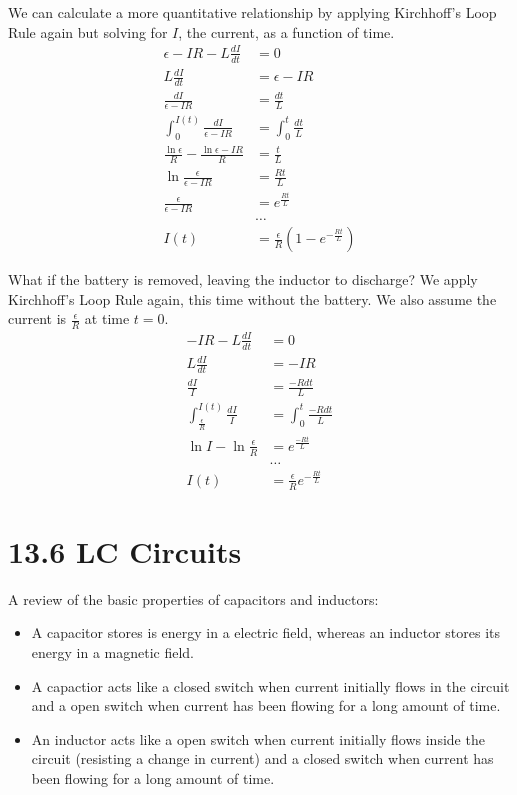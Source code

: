 \documentclass[12pt, titlepage]{article}
\begin{document}
We can calculate a more quantitative relationship by applying Kirchhoff's Loop Rule again but solving for $I$, the current, as a function of time.
\begin{align*}
    \epsilon - IR - L \frac{dI}{dt} &=0 \\
    L\frac{dI}{dt} &= \epsilon - IR \\
    \frac{dI}{\epsilon-IR}& =\frac{dt}{L} \\
    \int_{0}^{I(t)}\frac{dI}{\epsilon-IR}& =\int_{0}^{t}\frac{dt}{L} \\
    \frac{\ln \epsilon}{R}-\frac{\ln \epsilon-IR}{R}&=\frac{t}{L} \\
    \ln \frac{\epsilon}{\epsilon-IR} &= \frac{Rt}{L}\\
    \frac{\epsilon}{\epsilon-IR} &= e^{\frac{Rt}{L}}\\
    & \dots \\
    I(t) &= \boxed{\frac{\epsilon}{R}(1-e^{-\frac{Rt}{L}})}
\end{align*}

What if the battery is removed, leaving the inductor to discharge? We apply Kirchhoff's Loop Rule again, this time without the battery. We also assume the current is $\frac{\epsilon}{R}$ at time $t=0$.
\begin{align*}
    - IR - L \frac{dI}{dt} &=0 \\
    L\frac{dI}{dt} &= -IR \\
    \frac{dI}{I}&=\frac{-Rdt}{L} \\
    \int_{\frac{\epsilon}{R}}^{I(t)}\frac{dI}{I}&=\int_{0}^{t}\frac{-Rdt}{L} \\
    \ln I - \ln \frac{\epsilon}{R}&=e^{\frac{-Rt}{L}} \\
    & \dots \\
    I(t) &= \boxed{\frac{\epsilon}{R}e^{-\frac{Rt}{L}}}
\end{align*}

\section*{13.6 LC Circuits}

A review of the basic properties of capacitors and inductors:
\begin{itemize}
    \item A capacitor stores is energy in a electric field, whereas an inductor stores its energy in a magnetic field.
    \item A capactior acts like a closed switch when current initially flows in the circuit and a open switch when current has been flowing for a long amount of time.
    \item An inductor acts like a open switch when current initially flows inside the circuit (resisting a change in current) and a closed switch when current has been flowing for a long amount of time.
\end{itemize}
\end{document}
